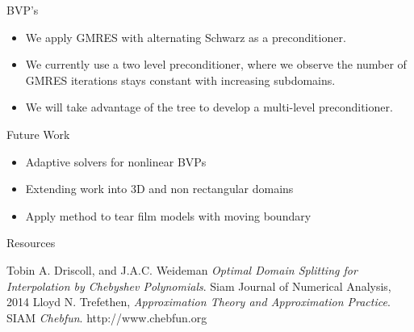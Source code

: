 \documentclass{beamer}
\begin{document}
\begin{frame}{BVP's}
\begin{itemize}
\item We apply GMRES with alternating Schwarz as a preconditioner.
\item We currently use a two level preconditioner, where we observe the number of GMRES iterations stays constant with increasing subdomains.
\item We will take advantage of the tree to develop a multi-level preconditioner.
\end{itemize}

\end{frame}

\begin{frame}{Future Work}
\begin{itemize}
\item Adaptive solvers for nonlinear BVPs
\item Extending work into 3D and non rectangular domains
\item Apply method to tear film models with moving boundary
\end{itemize}

\end{frame}

\begin{frame}{Resources}
\begin{thebibliography}{9}
Tobin A. Driscoll, and J.A.C. Weideman
\textit{Optimal Domain Splitting for Interpolation by Chebyshev Polynomials}. 
Siam Journal of Numerical Analysis, 2014
Lloyd N. Trefethen,
\textit{Approximation Theory and Approximation Practice}. 
SIAM
\textit{Chebfun}. 
http://www.chebfun.org
\end{thebibliography}
\end{frame}
\end{document}
